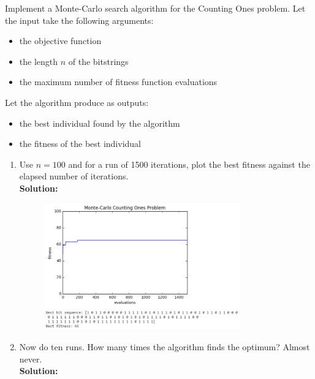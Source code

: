 \documentclass[a4paper]{article}
\begin{document}
\begin{enumerate}
	Implement a Monte-Carlo search algorithm for the Counting Ones problem. Let the input take the following arguments:
	
	\begin{itemize}
		\item the objective function
		\item the length $n$ of the bitstrings
		\item the maximum number of fitness function evaluations
\end{itemize}

Let the algorithm produce as outputs:

\begin{itemize}
	\item the best individual found by the algorithm
	\item the fitness of the best individual
\end{itemize}

\begin{enumerate}
	\item Use $n = 100$ and for a run of 1500 iterations, plot the best fitness against the elapsed number of iterations.\\
	\textbf{Solution:}\\
	
	\begin{figure}[H]
	\centering
  	\includegraphics[width=0.8\textwidth]{images/monte_carlo_1500_iterations.png}
	\end{figure}	
	
	
	\item Now do ten runs. How many times the algorithm finds the optimum? Almost never.\\
	\textbf{Solution:}\\
	

\end{enumerate}
\end{enumerate}
\end{document}
